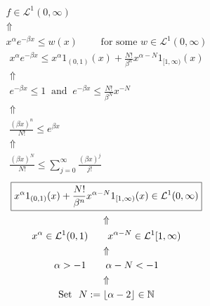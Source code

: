\begin{minipage}[t]{0.55\textwidth}
\vspace{-0.1in}
\begin{gather*}
\boxed{f\in \mathcal{L}^1(0,\infty )} \\
\Uparrow  \\
x^\alpha e^{-\beta x} \leq  w(x) \qquad\text{ for some }w\in \mathcal{L}^1(0,\infty ) 
\end{gather*}
\begin{gather*}
\boxed{x^{\alpha }e^{-\beta x}\leq x^\alpha  1_{(0,1)}(x)+\frac{N!}{\beta ^n}x^{\alpha -N}1_{[1,\infty )}(x)} \\
\Uparrow  \\
e^{-\beta x} \leq  1\  \text{ and }\  e^{-\beta x}\leq \frac{N!}{\beta ^N}x^{-N} \\
\Uparrow  \\
\frac{(\beta x)^n}{N!}\leq e^{\beta x} \\
\Uparrow  \\
\frac{(\beta x)^N}{N!}\leq \sum _{j=0}^\infty \frac{(\beta x)^j}{j!}
\end{gather*}
\begin{gather*}
\boxed{x^\alpha  1_{(0,1)}(x)+\frac{N!}{\beta ^n}x^{\alpha -N}1_{[1,\infty )}(x)\in \mathcal{L}^1(0,\infty )} \\
\Uparrow  \\
x^\alpha  \in \mathcal{L}^1(0,1) \qquad x^{\alpha -N}\in \mathcal{L}^1[1,\infty ) \\
\Uparrow  \\
\alpha >-1 \qquad \alpha -N<-1 \\
\Uparrow  \\
\text{Set }\  N:=\lfloor \alpha -2\rfloor \in \Bbb{N} 
\end{gather*}
\end{minipage}

\noindent\makebox[\linewidth]{\rule{\paperwidth}{0.4pt}}